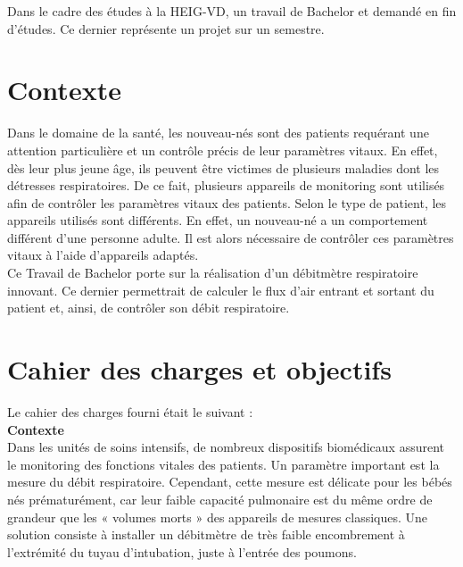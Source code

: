 Dans le cadre des études à la HEIG-VD, un travail de Bachelor et demandé en fin d'études. Ce dernier représente un projet sur un semestre. 

\section{Contexte}
Dans le domaine de la santé, les nouveau-nés sont des patients requérant une attention particulière et un contrôle précis de leur 
paramètres vitaux. En effet, dès leur plus jeune âge, ils peuvent être victimes de plusieurs maladies dont les détresses respiratoires. 
De ce fait, plusieurs appareils de monitoring sont utilisés afin de contrôler les paramètres vitaux des patients. 
Selon le type de patient, les appareils utilisés sont différents. En effet, un nouveau-né a un comportement différent d'une personne 
adulte. Il est alors nécessaire de contrôler ces paramètres vitaux à l'aide d'appareils adaptés. \\

Ce Travail de Bachelor porte sur la réalisation d'un débitmètre respiratoire innovant. Ce dernier permettrait de calculer le flux d'air entrant et sortant
du patient et, ainsi, de contrôler son débit respiratoire. 

\section{Cahier des charges et objectifs}
Le cahier des charges fourni était le suivant :\\
\textbf{Contexte}\\
Dans les unités de soins intensifs, de nombreux dispositifs biomédicaux assurent le monitoring des fonctions vitales des patients. Un 
paramètre important est la mesure du débit respiratoire. Cependant, cette mesure est délicate pour les bébés nés prématurément, car leur 
faible capacité pulmonaire est du même ordre de grandeur que les « volumes morts » des appareils de mesures classiques. Une solution 
consiste à installer un débitmètre de très faible encombrement à l’extrémité du tuyau d’intubation, juste à l’entrée des poumons.

